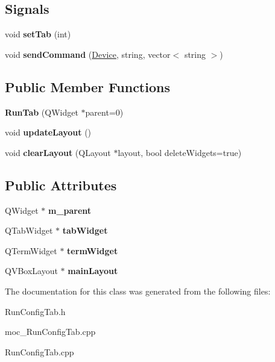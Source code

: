 \subsection*{Signals}
\begin{DoxyCompactItemize}
\item 
\mbox{\label{classRunTab_abb7ced8a7c06fbeb1efcbfd5a447f71e}} 
void {\bfseries set\+Tab} (int)
\item 
\mbox{\label{classRunTab_a61b6e1f9775bf6d713fa0c5584078e1b}} 
void {\bfseries send\+Command} (\hyperlink{classDevice}{Device}, string, vector$<$ string $>$)
\end{DoxyCompactItemize}
\subsection*{Public Member Functions}
\begin{DoxyCompactItemize}
\item 
\mbox{\label{classRunTab_a1114bef665434313ecdb37698f14b5d8}} 
{\bfseries Run\+Tab} (Q\+Widget $\ast$parent=0)
\item 
\mbox{\label{classRunTab_a9543f31e26a44eb097b15a319a6d605e}} 
void {\bfseries update\+Layout} ()
\item 
\mbox{\label{classRunTab_a965700df008f390b46f64d097f58a9fe}} 
void {\bfseries clear\+Layout} (Q\+Layout $\ast$layout, bool delete\+Widgets=true)
\end{DoxyCompactItemize}
\subsection*{Public Attributes}
\begin{DoxyCompactItemize}
\item 
\mbox{\label{classRunTab_af04b75f887960ee096a63a8d900ccbab}} 
Q\+Widget $\ast$ {\bfseries m\+\_\+parent}
\item 
\mbox{\label{classRunTab_ae0fa0fc309e5fd2e7b6ef0f64058eba3}} 
Q\+Tab\+Widget $\ast$ {\bfseries tab\+Widget}
\item 
\mbox{\label{classRunTab_a739838ef40e4196ba75464759dbb8004}} 
Q\+Term\+Widget $\ast$ {\bfseries term\+Widget}
\item 
\mbox{\label{classRunTab_a99ef949d7449cc935dab1540b520328e}} 
Q\+V\+Box\+Layout $\ast$ {\bfseries main\+Layout}
\end{DoxyCompactItemize}


The documentation for this class was generated from the following files\+:\begin{DoxyCompactItemize}
\item 
Run\+Config\+Tab.\+h\item 
moc\+\_\+\+Run\+Config\+Tab.\+cpp\item 
Run\+Config\+Tab.\+cpp\end{DoxyCompactItemize}

